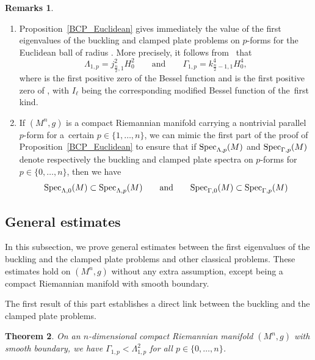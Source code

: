 \documentclass[10pt,a4paper]{amsart}
\numberwithin{equation}{section}
\newtheorem{Theorem}{Theorem}[section]
\theoremstyle{definition}
\newtheorem{Remarks}[Theorem]{Remarks}
\begin{document}
\begin{Remarks}\quad
\begin{enumerate}\itemsep=0pt
\item Proposition~\ref{BCP_Euclidean} gives immediately the value of the first eigenvalues of the buckling and clamped plate problems on $p$-forms for the Euclidean ball of radius .
More precisely, it follows from~\cite[Section~1]{AL} that
\[
\Lambda_{1,p}=j_{\frac{n}{2},1}^2 H_0^2\qquad\text{and}\qquad\Gamma_{1,p}=k_{\frac{n}{2}-1,1}^4 H_0^4,
\]
where  is the first positive zero of the Bessel function  and  is the first positive zero of , with $I_\ell$ being the corresponding modified Bessel function of the~first kind.

\item If $(M^n,g)$ is a compact Riemannian manifold carrying a nontrivial parallel $p$-form for a~certain $p\in\{1,\dots,n\}$, we can mimic the first part of the proof of Proposition~\ref{BCP_Euclidean} to ensure that if ${\rm Spec}_{\Lambda,p}(M)$ and ${\rm Spec}_{\Gamma,p}(M)$ denote respectively the buckling and clamped plate spectra on $p$-forms for $p\in\{0,\dots,n\}$, then we have
\[
{\rm Spec}_{\Lambda,0}(M)\subset {\rm Spec}_{\Lambda,p}(M) \qquad\text{and}\qquad {\rm Spec}_{\Gamma,0}(M)\subset {\rm Spec}_{\Gamma,p}(M)
\]
\end{enumerate}
\end{Remarks}

\subsection{General estimates}

In this subsection, we prove general estimates between the first eigenvalues of the buckling and the clamped plate problems and other classical problems. These estimates hold on $(M^n,g)$ without any extra assumption, except being a compact Riemannian manifold with smooth boundary.

The first result of this part establishes a direct link between the buckling and the clamped plate problems.
\begin{Theorem}\label{BuckCP}
On an $n$-dimensional compact Riemannian manifold $(M^n,g)$ with smooth boundary, we have $\Gamma_{1,p}<\Lambda_{1,p}^2$ for all $p\in\{0,\dots,n\}$.
\end{Theorem}
\end{document}

